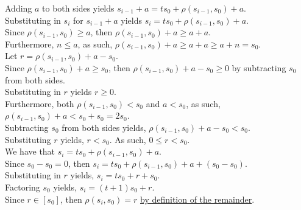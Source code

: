 \documentclass[a4paper,12pt]{article}
\begin{document}
\noindent Adding $a$ to both sides yields $s_{i - 1} + a = ts_0 + \rho(s_{i - 1}, s_0) + a$.\\

\noindent Substituting in $s_i$ for $s_{i - 1} + a$ yields $s_i = ts_0 + \rho(s_{i - 1}, s_0) + a$.\\

\noindent Since $\rho(s_{i - 1}, s_0) \geq a$, then $\rho(s_{i - 1}, s_0) + a \geq a + a$.\\

\noindent Furthermore, $n \leq a$, as such, $\rho(s_{i - 1}, s_0) + a \geq a + a \geq a + n = s_0$.\\

\noindent Let $r = \rho(s_{i - 1}, s_0) + a - s_0$.\\

\noindent Since $\rho(s_{i - 1}, s_0) + a \geq s_0$, then $\rho(s_{i - 1}, s_0) + a - s_0 \geq 0$ by subtracting $s_0$ from both sides.\\

\noindent Substituting in $r$ yields $r \geq 0$.\\

\noindent Furthermore, both $\rho(s_{i - 1}, s_0) < s_0$ and $a < s_0$, as such,\\ $\rho(s_{i - 1}, s_0) + a < s_0 + s_0 = 2s_0$.\\

\noindent Subtracting $s_0$ from both sides yields, $\rho(s_{i - 1}, s_0) + a - s_0 < s_0$.\\

\noindent Substituting $r$ yields, $r < s_0$. As such, $0 \leq r < s_0$.\\

\noindent We have that $s_i = ts_0 + \rho(s_{i - 1}, s_0) + a$.\\

\noindent Since $s_0 - s_0 = 0$, then $s_i = ts_0 + \rho(s_{i - 1}, s_0) + a + (s_0 - s_0)$.\\

\noindent Substituting in $r$ yields, $s_i = ts_0 + r + s_0$.\\

\noindent Factoring $s_0$ yields, $s_i = (t + 1)s_0 + r$.\\

\noindent Since $r \in [s_0]$, then $\rho(s_i, s_0) = r$ \hyperlink{theorem:remainder_theorem}{by definition of the remainder}.\\
\end{document}
